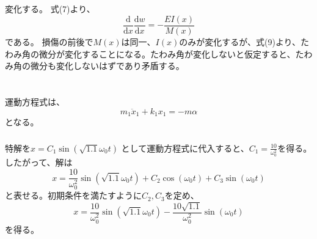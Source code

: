 \documentclass[a4paper]{jsarticle}
\begin{document}
\subsection{}
変化する。
式(7)より、
\begin{equation}
  \frac{\mathrm{d}}{\mathrm{d} x} \frac{\mathrm{d} w}{\mathrm{d} x}
  = -\frac{E I(x)}{M(x)}
\end{equation}
である。
損傷の前後で$M(x)$は同一、$I(x)$のみが変化するが、式(9)より、たわみ角の微分が変化することになる。たわみ角が変化しないと仮定すると、たわみ角の微分も変化しないはずであり矛盾する。

\section{}
\subsection{}
\subsubsection{}
運動方程式は、
\begin{equation}
  m_1 \ddot{x}_1 + k_1 x_1 = -m \alpha
\end{equation}
となる。

\subsubsection{}
特解を$x = C_1 \sin \left(\sqrt{1.1} \omega_0 t\right)$
として運動方程式に代入すると、$C_1 = \frac{10}{\omega_0^2}$を得る。
したがって、解は
\begin{equation}
  x = \frac{10}{\omega_0^2} \sin \left(\sqrt{1.1} \omega_0 t\right) + C_2 \cos (\omega_0 t) + C_3 \sin (\omega_0 t)
\end{equation}
と表せる。初期条件を満たすように$C_2, C_3$を定め、
\begin{equation}
  x = \frac{10}{\omega_0^2} \sin \left(\sqrt{1.1} \omega_0 t\right)
  -\frac{10 \sqrt{1.1}}{\omega_0^2} \sin (\omega_0 t)
\end{equation}
を得る。

\subsection{}
\end{document}
